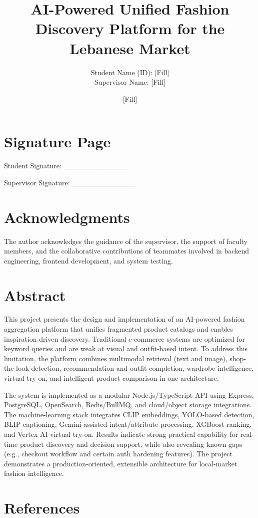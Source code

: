 \documentclass[12pt,a4paper]{report}
\title{AI-Powered Unified Fashion Discovery Platform for the Lebanese Market}
\author{Student Name (ID): [Fill] \\ Supervisor Name: [Fill]}
\date{[Fill]}
\begin{document}
\maketitle
\tableofcontents
\clearpage


\chapter{Signature Page}
Student Signature: \_\_\_\_\_\_\_\_\_\_\_\_

Supervisor Signature: \_\_\_\_\_\_\_\_\_\_\_\_


\chapter{Acknowledgments}
The author acknowledges the guidance of the supervisor, the support of faculty members, and the collaborative contributions of teammates involved in backend engineering, frontend development, and system testing.


\chapter{Abstract}
This project presents the design and implementation of an AI-powered fashion aggregation platform that unifies fragmented product catalogs and enables inspiration-driven discovery. Traditional e-commerce systems are optimized for keyword queries and are weak at visual and outfit-based intent. To address this limitation, the platform combines multimodal retrieval (text and image), shop-the-look detection, recommendation and outfit completion, wardrobe intelligence, virtual try-on, and intelligent product comparison in one architecture.


The system is implemented as a modular Node.js/TypeScript API using Express, PostgreSQL, OpenSearch, Redis/BullMQ, and cloud/object storage integrations. The machine-learning stack integrates CLIP embeddings, YOLO-based detection, BLIP captioning, Gemini-assisted intent/attribute processing, XGBoost ranking, and Vertex AI virtual try-on. Results indicate strong practical capability for real-time product discovery and decision support, while also revealing known gaps (e.g., checkout workflow and certain auth hardening features). The project demonstrates a production-oriented, extensible architecture for local-market fashion intelligence.


\chapter*{References}
\end{document}
